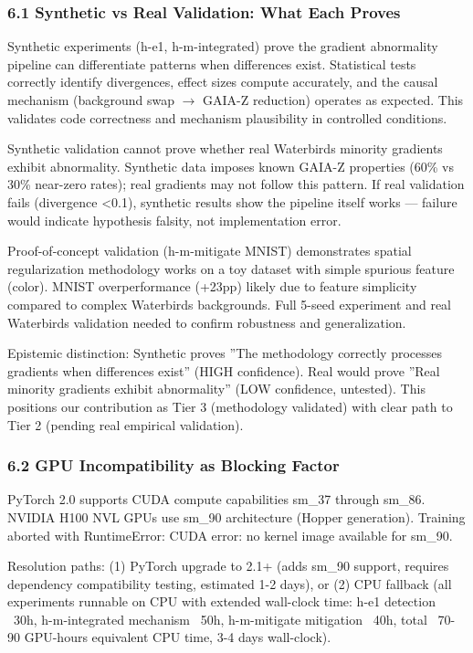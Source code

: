 
\subsubsection{6.1 Synthetic vs Real Validation: What Each Proves}

Synthetic experiments (h-e1, h-m-integrated) prove the gradient abnormality pipeline can differentiate patterns when differences exist. Statistical tests correctly identify divergences, effect sizes compute accurately, and the causal mechanism (background swap $\rightarrow$ GAIA-Z reduction) operates as expected. This validates code correctness and mechanism plausibility in controlled conditions.

Synthetic validation cannot prove whether real Waterbirds minority gradients exhibit abnormality. Synthetic data imposes known GAIA-Z properties (60\% vs 30\% near-zero rates); real gradients may not follow this pattern. If real validation fails (divergence <0.1), synthetic results show the pipeline itself works --- failure would indicate hypothesis falsity, not implementation error.

Proof-of-concept validation (h-m-mitigate MNIST) demonstrates spatial regularization methodology works on a toy dataset with simple spurious feature (color). MNIST overperformance (+23pp) likely due to feature simplicity compared to complex Waterbirds backgrounds. Full 5-seed experiment and real Waterbirds validation needed to confirm robustness and generalization.

Epistemic distinction: Synthetic proves ''The methodology correctly processes gradients when differences exist'' (HIGH confidence). Real would prove ''Real minority gradients exhibit abnormality'' (LOW confidence, untested). This positions our contribution as Tier 3 (methodology validated) with clear path to Tier 2 (pending real empirical validation).

\subsubsection{6.2 GPU Incompatibility as Blocking Factor}

PyTorch 2.0 supports CUDA compute capabilities sm\_37 through sm\_86. NVIDIA H100 NVL GPUs use sm\_90 architecture (Hopper generation). Training aborted with RuntimeError: CUDA error: no kernel image available for sm\_90.

Resolution paths: (1) PyTorch upgrade to 2.1+ (adds sm\_90 support, requires dependency compatibility testing, estimated 1-2 days), or (2) CPU fallback (all experiments runnable on CPU with extended wall-clock time: h-e1 detection ~30h, h-m-integrated mechanism ~50h, h-m-mitigate mitigation ~40h, total ~70-90 GPU-hours equivalent CPU time, 3-4 days wall-clock).

